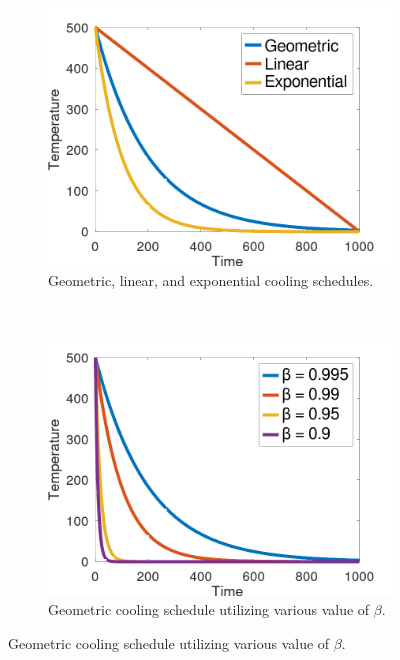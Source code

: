 \documentclass[ee,thesis]{usuthesis}
\begin{document}
\begin{figure}[t!]
  \begin{subfigure}[t]{0.5\textwidth}
    \centering \includegraphics[width=\textwidth]{img/cool_func.png}
    \caption{Geometric, linear, and exponential cooling schedules.}
    \label{fig:cool}
  \end{subfigure}
  ~
  \begin{subfigure}[t]{0.5\textwidth}
    \centering \includegraphics[width=\textwidth]{img/geometric.png}
    \caption{Geometric cooling schedule utilizing various value of $\beta$.}
    \label{fig:geometric}
  \end{subfigure}
\end{figure}
\end{document}
